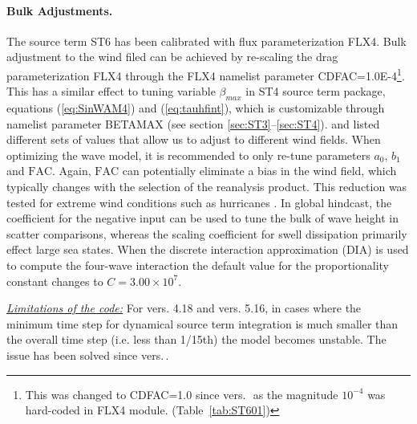 \noindent
\paragraph{Bulk Adjustments.} The source term
{\code ST6} has been calibrated with flux parameterization {\code FLX4}.
Bulk adjustment to the wind filed can be achieved by re-scaling the drag
parameterization {\code FLX4} through the {\F FLX4} namelist parameter {\code
 CDFAC=1.0E-4}\footnote{This was changed to {\code CDFAC=1.0} since vers.\,\WWver\ as the magnitude $10^{-4}$ was hard-coded
in {\code FLX4} module. (Table~\ref{tab:ST601})}. This has a similar effect to tuning variable
$\beta_{max}$ in {\code ST4} source term package, equations
(\ref{eq:SinWAM4}) and (\ref{eq:tauhfint}), which is customizable
through namelist parameter {\code BETAMAX} (see section
\ref{sec:ST3}--\ref{sec:ST4}). \citet{pro:Aea11} and \citet{art:RA13}
listed different sets of values that allow us to adjust to different
wind fields. When optimizing the wave model, it is recommended to
only re-tune parameters $a_0$, $b_1$ and $\mathrm{FAC}$. Again, $\mathrm{FAC}$
can potentially eliminate a bias in the wind field, which typically changes
with the selection of the reanalysis product. This reduction was tested
for extreme wind conditions such as hurricanes \citep{art:ZBRY15}.  In global
hindcast, the coefficient for the negative input can be used to tune
the bulk of wave height in scatter comparisons, whereas the scaling
coefficient for swell dissipation primarily effect large sea states.
When the discrete interaction approximation ({\code DIA}) is used to compute the four-wave
interaction the default value for the proportionality constant changes to
$C=3.00\times10^7$.

\textrm{\textit{\underline{Limitations of the code:}}} For vers. 4.18 and
vers. 5.16, in cases where the minimum time step for dynamical source term
integration is much smaller than the overall time step (i.e. less than
1/15th) the model becomes unstable. The issue has been solved since vers.\,\WWver.
